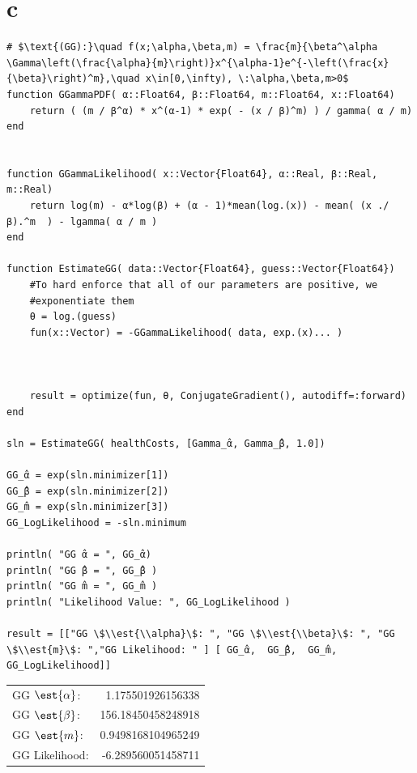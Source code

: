 \documentclass[12pt, letterpaper]{paper}
\begin{document}
\section{c}
\label{sec:org730c01d}
\begin{verbatim}
# $\text{(GG):}\quad f(x;\alpha,\beta,m) = \frac{m}{\beta^\alpha \Gamma\left(\frac{\alpha}{m}\right)}x^{\alpha-1}e^{-\left(\frac{x}{\beta}\right)^m},\quad x\in[0,\infty), \:\alpha,\beta,m>0$
function GGammaPDF( α::Float64, β::Float64, m::Float64, x::Float64)
    return ( (m / β^α) * x^(α-1) * exp( - (x / β)^m) ) / gamma( α / m)
end


function GGammaLikelihood( x::Vector{Float64}, α::Real, β::Real, m::Real)
    return log(m) - α*log(β) + (α - 1)*mean(log.(x)) - mean( (x ./ β).^m  ) - lgamma( α / m )    
end

function EstimateGG( data::Vector{Float64}, guess::Vector{Float64})
    #To hard enforce that all of our parameters are positive, we
    #exponentiate them
    θ = log.(guess)
    fun(x::Vector) = -GGammaLikelihood( data, exp.(x)... )



    result = optimize(fun, θ, ConjugateGradient(), autodiff=:forward)
end

sln = EstimateGG( healthCosts, [Gamma_̂α, Gamma_̂β, 1.0])

GG_̂α = exp(sln.minimizer[1])
GG_̂β = exp(sln.minimizer[2])
GG_̂m = exp(sln.minimizer[3])
GG_LogLikelihood = -sln.minimum

println( "GG ̂α = ", GG_̂α)
println( "GG ̂β = ", GG_̂β )
println( "GG ̂m = ", GG_̂m )
println( "Likelihood Value: ", GG_LogLikelihood )

result = [["GG \$\\est{\\alpha}\$: ", "GG \$\\est{\\beta}\$: ", "GG \$\\est{m}\$: ","GG Likelihood: " ] [ GG_̂α,  GG_̂β,  GG_̂m, GG_LogLikelihood]]
\end{verbatim}

\begin{center}
\begin{tabular}{lr}
GG \(\est{\alpha}\): & 1.175501926156338\\
GG \(\est{\beta}\): & 156.18450458248918\\
GG \(\est{m}\): & 0.9498168104965249\\
GG Likelihood: & -6.289560051458711\\
\end{tabular}
\end{center}
\end{document}
